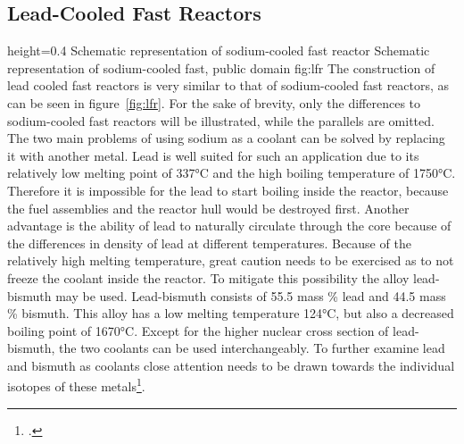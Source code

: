 \subsection{Lead-Cooled Fast Reactors}
    {height=0.4\textheight}
    {Schematic representation of sodium-cooled fast reactor}
    {Schematic representation of sodium-cooled fast, public domain}
    {fig:lfr}
The construction of lead cooled fast reactors is very similar to that of sodium-cooled fast reactors,
as can be seen in figure~\ref{fig:lfr}. For the sake of brevity, only the differences to sodium-cooled
fast reactors will be illustrated, while the parallels are omitted.\\
The two main problems of using sodium as a coolant can be solved by replacing it with another metal.
Lead is well suited for such an application due to its relatively low melting point of 337°C and
the high boiling temperature of 1750°C. Therefore it is impossible for the lead to start boiling inside
the reactor, because the fuel assemblies and the reactor hull would be destroyed first.
Another advantage is the ability of lead to naturally circulate through the core because of the differences
in density of lead at different temperatures.
Because of the relatively high melting temperature, great caution needs to be exercised as to not freeze the coolant
inside the reactor. To mitigate this possibility the alloy lead-bismuth may be used. Lead-bismuth consists
of 55.5 mass \% lead and 44.5 mass \% bismuth. This alloy has a low melting temperature 124°C, but also
a decreased boiling point of 1670°C. Except for the higher nuclear cross section of lead-bismuth, the
two coolants can be used interchangeably. To further examine lead and bismuth as coolants close attention
needs to be drawn towards the individual isotopes of these metals\footcite[137-174]{IVHandbook}.
